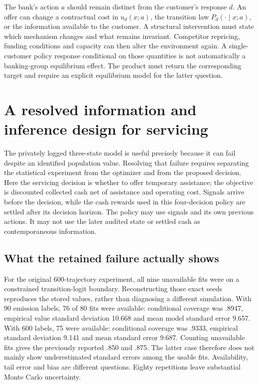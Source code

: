 The bank's action $a$ should remain distinct from the customer's
response $d$. An offer can change a contractual cost in $u_d(x;a)$,
the transition law $P_d(\cdot\mid x;a)$, or the information available
to the customer. A structural intervention must state which mechanism
changes and what remains invariant. Competitor repricing, funding
conditions and capacity can then alter the environment again. A
single-customer policy response conditional on those quantities is
not automatically a banking-group equilibrium effect. The product
must return the corresponding target and require an explicit equilibrium
model for the latter question.



\section{A resolved information and inference design for servicing}
\label{s6:servicing}
The privately logged three-state model is useful precisely because it can
fail despite an identified population value. Resolving that failure requires
separating the statistical experiment from the optimizer and from the
proposed decision. Here the servicing decision is whether to offer temporary
assistance; the objective is discounted collected cash net of assistance and
operating cost. Signals arrive before the decision, while the cash rewards
used in this four-decision policy are settled after its decision horizon.
The policy may use signals and its own previous actions. It may not use the
later audited state or settled cash as contemporaneous information.

\subsection{What the retained failure actually shows}
For the original 600-trajectory experiment, all nine unavailable fits were
on a constrained transition-logit boundary. Reconstructing those exact seeds
reproduces the stored values, rather than diagnosing a different simulation.
With 90 emission labels, 76 of 80 fits were available: conditional coverage
was .8947, empirical value standard deviation 10.668 and mean model standard
error 9.657. With 600 labels, 75 were available: conditional coverage was
.9333, empirical standard deviation 9.141 and mean standard error 9.687.
Counting unavailable fits gives the previously reported .850 and .875.
The latter case therefore does not mainly show underestimated standard
errors among the usable fits. Availability, tail error and bias are different
questions. Eighty repetitions leave substantial Monte Carlo uncertainty.

